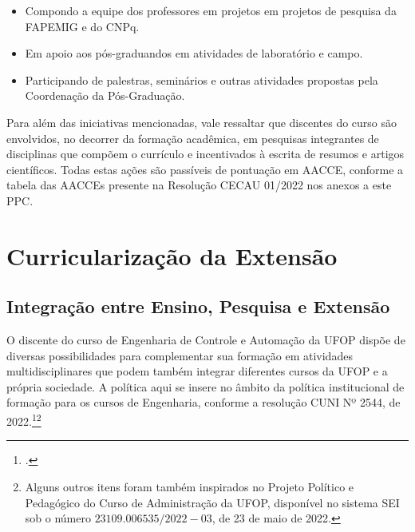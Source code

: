 \documentclass[
	12pt,				%
	openright,			%
	oneside,			%
	a4paper,			%
	english,			%
	brazil				%
	]{abntex2}
\begin{document}
\begin{itemize}
    \item Compondo a equipe dos professores em projetos em projetos de pesquisa da FAPEMIG e do CNPq.
    \item Em apoio aos pós-graduandos em atividades de laboratório e campo.
    \item Participando de palestras, seminários e outras atividades propostas pela Coordenação da Pós-Graduação.
\end{itemize}

Para além das iniciativas mencionadas, vale ressaltar que discentes do curso são envolvidos, no decorrer da formação acadêmica, em pesquisas integrantes de disciplinas que compõem o currículo e incentivados à escrita de resumos e artigos científicos. Todas estas ações são passíveis de pontuação em AACCE, conforme a tabela das AACCEs presente na Resolução CECAU 01/2022 nos anexos a este PPC.


\chapter{Curricularização da Extensão}

\section{Integração entre Ensino, Pesquisa e Extensão}

O discente do curso de Engenharia de Controle e Automação da UFOP dispõe de diversas possibilidades para complementar sua formação em atividades multidisciplinares que podem também integrar diferentes cursos da UFOP e a própria sociedade. A política aqui se insere no âmbito da política institucional de formação para os cursos de Engenharia, conforme a resolução CUNI Nº 2544, de 2022.\footcites[Em especial podemos citar o trecho II da referida política, que inclui os chamados Núcleos e Estruturas de formação, bem como a questão da curricularização da extensão. Ver em][pp.~16--26]{politica-eng-2022-ufop}\footnote{Alguns outros itens foram também inspirados no Projeto Político e Pedagógico do Curso de Administração da UFOP, disponível no sistema SEI sob o número $23109.006535/2022-03$, de 23 de maio de 2022.}
\end{document}
